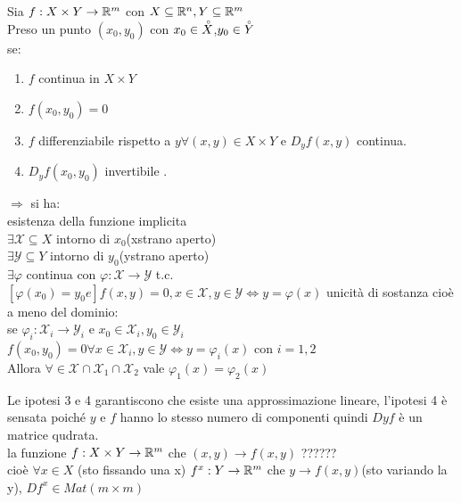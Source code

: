 \begin{theorem}
	\label{teo:funz_impl}
	Sia $f:X\times Y\rightarrow \mathbb{R}^m$ con $X\subseteq \mathbb{R}^n, Y\subseteq \mathbb{R}^m$\\
	Preso un punto $(x_0,y_0)$ con $x_0\in \accentset{\circ}{X}$,$y_0\in \accentset{\circ}{Y}$\\
	se:
	\begin{enumerate}
		\item $f$ continua in $X\times Y$
		\item $f(x_0,y_0)=0$
		\item $f$ differenziabile rispetto a $y \forall (x,y)\in X\times Y$ e $D_yf(x,y)$ continua.
		\item $D_yf(x_0,y_0)$ invertibile .
	\end{enumerate}
	$\Rightarrow $ si ha:\\
	esistenza della funzione implicita\\
	$\exists \mathcal{X}\subseteq X$ intorno di $x_0$(xstrano aperto)\\
	$\exists \mathcal{Y}\subseteq Y$ intorno di $y_0$(ystrano aperto)\\
	$\exists\varphi$ continua con $\varphi:\mathcal{X}\rightarrow\mathcal{Y}$ t.c. $[\varphi (x_0)=y_0 e] f(x,y)=0, x\in\mathcal{X},y\in\mathcal{Y} \Leftrightarrow y=\varphi(x)$
	unicità di sostanza cioè a meno del dominio:\\
	se $\varphi_i:\mathcal{X}_i\rightarrow\mathcal{Y}_i$ e $x_0\in\mathcal{X}_i,y_0\in\mathcal{Y}_i$\\
	$f(x_0,y_0)=0 \forall x\in\mathcal{X}_i, y\in \mathcal{Y}\Leftrightarrow y=\varphi_i(x)$ con $i=1,2$\\
	Allora $\forall\in\mathcal{X}\cap\mathcal{X}_1\cap\mathcal{X}_2$ vale $\varphi_1(x)=\varphi_2(x)$

	\observation
	Le ipotesi 3 e 4 garantiscono che esiste una approssimazione lineare, l'ipotesi 4 è sensata poiché $y$ e $f$ hanno lo stesso numero di componenti quindi $Dyf$ è un matrice qudrata.\\
	la funzione $f:X\times Y\rightarrow \mathbb{R}^m$ che $(x,y)\rightarrow f(x,y)$ ??????\\
	cioè $\forall x\in X$ (sto fissando una x) $f^x:Y\rightarrow \mathbb{R}^m$ che $y\rightarrow f(x,y)$(sto variando la y), $Df^x\in Mat(m\times m)$


\end{theorem}
